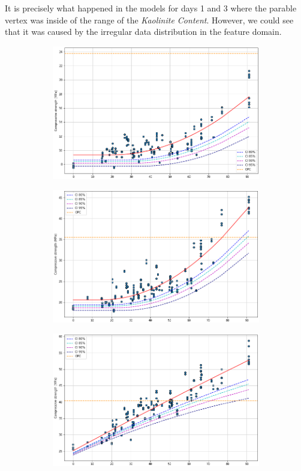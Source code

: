 \documentclass[10pt,conference,compsocconf]{IEEEtran}
\begin{document}
It is precisely what happened in the models for days 1 and 3 where the parable vertex was inside of the range of the \textit{Kaolinite Content}. However, we could see that it was caused by the irregular data distribution in the feature domain.


\newpage
\begin{figure}
\begin{subfigure}{.5\textwidth}
  \centering
  \includegraphics[width=0.84\columnwidth]{figures/day1_CI.png}
  \label{fig:sub-first}
\end{subfigure}
\newline
\begin{subfigure}{.5\textwidth}
  \centering
  \includegraphics[width=0.84\columnwidth]{figures/day3_CI.png}
  \label{fig:sub-second}
\end{subfigure}
\newline
\begin{subfigure}{.5\textwidth}
  \centering
  \includegraphics[width=0.84\columnwidth]{figures/day7_CI.png} 

\end{subfigure}
\end{figure}
\end{document}
